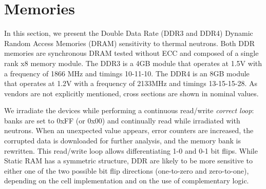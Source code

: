 \section{Memories}
\label{sec_memories}






In this section, we present the Double Data Rate (DDR3 and DDR4) Dynamic
Random Access Memories (DRAM) sensitivity to thermal neutrons. Both DDR memories are synchronous DRAM tested without ECC and composed of a single rank x8 memory module. The DDR3 is a 4GB module that operates at 1.5V with a frequency of 1866 MHz and timings 10-11-10. The DDR4 is an 8GB module that operates at 1.2V with a frequency of 2133MHz and timings 13-15-15-28. As vendors are
not explicitly mentioned, cross sections are shown in nominal values. 

We irradiate the devices while performing a continuous read/write \textit{correct loop}: banks are set to 0xFF (or 0x00) and continually read while irradiated with neutrons. When an unexpected value appears, error counters are increased, the corrupted data is downloaded for further analysis, and the memory bank is rewritten. This read/write loop allows differentiating 1-0 and 0-1 bit flips. While Static RAM has a symmetric structure, DDR are likely to be more sensitive to either one of the two possible bit flip directions (one-to-zero and zero-to-one), depending on the cell implementation and on the use of complementary logic.


